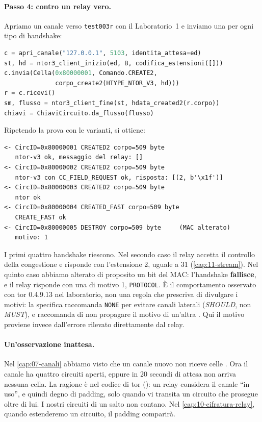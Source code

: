 \paragraph{Passo 4: contro un relay vero.} Apriamo un canale verso \texttt{test003r} con il Laboratorio~1 e inviamo una  per ogni tipo di handshake:
\begin{lstlisting}[language=Python]
c = apri_canale("127.0.0.1", 5103, identita_attesa=ed)
st, hd = ntor3_client_inizio(ed, B, codifica_estensioni([]))
c.invia(Cella(0x80000001, Comando.CREATE2,
              corpo_create2(HTYPE_NTOR_V3, hd)))
r = c.ricevi()
sm, flusso = ntor3_client_fine(st, hdata_created2(r.corpo))
chiavi = ChiaviCircuito.da_flusso(flusso)
\end{lstlisting}
Ripetendo la prova con le varianti, si ottiene:
\begin{lstlisting}[numbers=none]
<- CircID=0x80000001 CREATED2 corpo=509 byte
   ntor-v3 ok, messaggio del relay: []
<- CircID=0x80000002 CREATED2 corpo=509 byte
   ntor-v3 con CC_FIELD_REQUEST ok, risposta: [(2, b'\x1f')]
<- CircID=0x80000003 CREATED2 corpo=509 byte
   ntor ok
<- CircID=0x80000004 CREATED_FAST corpo=509 byte
   CREATE_FAST ok
<- CircID=0x80000005 DESTROY corpo=509 byte     (MAC alterato)
   motivo: 1
\end{lstlisting}
I primi quattro handshake riescono. Nel secondo caso il relay accetta il controllo della congestione e risponde con l'estensione 2,  uguale a 31 (\cref{cap:11-stream}). Nel quinto caso abbiamo alterato di proposito un bit del MAC: l'handshake \textbf{fallisce}, e il relay risponde con una  di motivo 1, \texttt{PROTOCOL}. È il comportamento osservato con tor 0.4.9.13 nel laboratorio, non una regola che prescriva di divulgare i motivi: la specifica  raccomanda \texttt{NONE} per evitare canali laterali (\emph{SHOULD}, non \emph{MUST}), e raccomanda di non propagare il motivo di un'altra . Qui il motivo proviene invece dall'errore rilevato direttamente dal relay.

\paragraph{Un'osservazione inattesa.} Nel \cref{cap:07-canali} abbiamo visto che un canale nuovo non riceve celle . Ora il canale ha quattro circuiti aperti, eppure in 20 secondi di attesa non arriva nessuna cella. La ragione è nel codice di tor (): un relay considera il canale \enquote{in uso}, e quindi degno di padding, solo quando vi transita un circuito che prosegue oltre di lui. I nostri circuiti di un salto non contano. Nel \cref{cap:10-cifratura-relay}, quando estenderemo un circuito, il padding comparirà.

